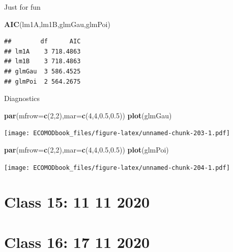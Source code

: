\documentclass[
]{book}
\newenvironment{Shaded}{\begin{snugshade}}{\end{snugshade}}
\newcommand{\DataTypeTok}[1]{\textcolor[rgb]{0.13,0.29,0.53}{#1}}
\newcommand{\DecValTok}[1]{\textcolor[rgb]{0.00,0.00,0.81}{#1}}
\newcommand{\FloatTok}[1]{\textcolor[rgb]{0.00,0.00,0.81}{#1}}
\newcommand{\KeywordTok}[1]{\textcolor[rgb]{0.13,0.29,0.53}{\textbf{#1}}}
\newcommand{\NormalTok}[1]{#1}
\begin{document}
Just for fun

\begin{Shaded}
\begin{Highlighting}[]
\KeywordTok{AIC}\NormalTok{(lm1A,lm1B,glmGau,glmPoi)}
\end{Highlighting}
\end{Shaded}

\begin{verbatim}
##        df      AIC
## lm1A    3 718.4863
## lm1B    3 718.4863
## glmGau  3 586.4525
## glmPoi  2 564.2675
\end{verbatim}

Diagnostics

\begin{Shaded}
\begin{Highlighting}[]
\KeywordTok{par}\NormalTok{(}\DataTypeTok{mfrow=}\KeywordTok{c}\NormalTok{(}\DecValTok{2}\NormalTok{,}\DecValTok{2}\NormalTok{),}\DataTypeTok{mar=}\KeywordTok{c}\NormalTok{(}\DecValTok{4}\NormalTok{,}\DecValTok{4}\NormalTok{,}\FloatTok{0.5}\NormalTok{,}\FloatTok{0.5}\NormalTok{))}
\KeywordTok{plot}\NormalTok{(glmGau)}
\end{Highlighting}
\end{Shaded}

\texttt{[image: ECOMODbook\_files/figure-latex/unnamed-chunk-203-1.pdf]}

\begin{Shaded}
\begin{Highlighting}[]
\KeywordTok{par}\NormalTok{(}\DataTypeTok{mfrow=}\KeywordTok{c}\NormalTok{(}\DecValTok{2}\NormalTok{,}\DecValTok{2}\NormalTok{),}\DataTypeTok{mar=}\KeywordTok{c}\NormalTok{(}\DecValTok{4}\NormalTok{,}\DecValTok{4}\NormalTok{,}\FloatTok{0.5}\NormalTok{,}\FloatTok{0.5}\NormalTok{))}
\KeywordTok{plot}\NormalTok{(glmPoi)}
\end{Highlighting}
\end{Shaded}

\texttt{[image: ECOMODbook\_files/figure-latex/unnamed-chunk-204-1.pdf]}

\hypertarget{aula15}{%
\chapter{Class 15: 11 11 2020}\label{aula15}}

\hypertarget{aula16}{%
\chapter{Class 16: 17 11 2020}\label{aula16}}
\end{document}

